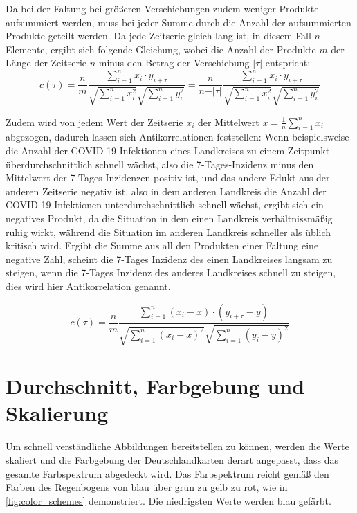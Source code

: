 Da bei der Faltung bei größeren Verschiebungen zudem weniger Produkte aufsummiert werden, muss bei jeder Summe durch die Anzahl der aufsummierten Produkte geteilt werden. Da jede Zeitserie gleich lang ist, in diesem Fall $n$ Elemente, ergibt sich folgende Gleichung, wobei die Anzahl der Produkte $m$ der Länge der Zeitserie $n$ minus den Betrag der Verschiebung $\vert\tau\vert$ entspricht:
\begin{equation}\label{eq:Korrelation}
    c(\tau) =\frac{n}{m} \frac{\sum_{i=1}^n x_i\cdot y_{i+\tau}}{\sqrt{\sum_{i=1}^n x_i^2}\sqrt{\sum_{i=1}^n y_i^2}}=
    \frac{n}{n-\vert\tau\vert} \frac{\sum_{i=1}^n x_i\cdot y_{i+\tau}}{\sqrt{\sum_{i=1}^n x_i^2}\sqrt{\sum_{i=1}^n y_i^2}}
\end{equation}

Zudem wird von jedem Wert der Zeitserie $x_i$ der Mittelwert $\overline x = \frac{1}{n}\sum_{i=1}^n x_i$ abgezogen, dadurch lassen sich Antikorrelationen feststellen: Wenn beispielsweise die Anzahl der COVID-19 Infektionen eines Landkreises zu einem Zeitpunkt überdurchschnittlich schnell wächst, also die 7-Tages-Inzidenz minus den Mittelwert der 7-Tages-Inzidenzen positiv ist, und das andere Edukt aus der anderen Zeitserie negativ ist, also in dem anderen Landkreis die Anzahl der COVID-19 Infektionen unterdurchschnittlich schnell wächst, ergibt sich ein negatives Produkt, da die Situation in dem einen Landkreis verhältnissmäßig ruhig wirkt, während die Situation im anderen Landkreis schneller als üblich kritisch wird. Ergibt die Summe aus all den Produkten einer Faltung eine negative Zahl, scheint die 7-Tages Inzidenz des einen Landkreises langsam zu steigen, wenn die 7-Tages Inzidenz des anderes Landkreises schnell zu steigen, dies wird hier Antikorrelation genannt.

\begin{equation}\label{eq:Korrelation}
    c(\tau) =\frac{n}{m}
    \frac{\sum_{i=1}^n (x_i-\overline x)\cdot (y_{i+\tau}-\overline y)}{\sqrt{\sum_{i=1}^n (x_i-\overline x)^2}\sqrt{\sum_{i=1}^n (y_i-\overline y)^2}}
\end{equation}
\section{Durchschnitt, Farbgebung und Skalierung}\label{sec:Durchschnitt, Farbgebung und Skalierung}
Um schnell verständliche Abbildungen bereitstellen zu können, werden die Werte skaliert und die Farbgebung der Deutschlandkarten derart angepasst, dass das gesamte Farbspektrum abgedeckt wird. Das Farbspektrum reicht gemäß den Farben des Regenbogens von blau über grün zu gelb zu rot, wie in \autoref{fig:color_schemes} demonstriert. Die niedrigsten Werte werden blau gefärbt.


